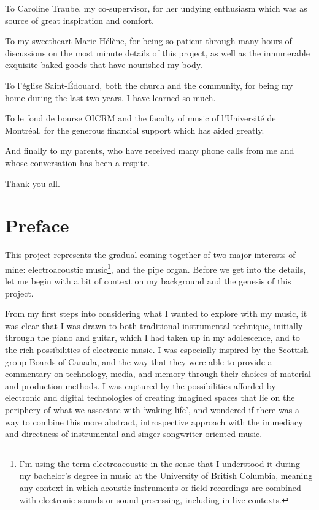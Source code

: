 \documentclass[12pt,twoside,maitrise]{dms_ks}
\theoremstyle{definition}
\begin{document}
{To Caroline Traube, my co-supervisor, for her undying enthusiasm which was as source of great inspiration and comfort.

To my sweetheart Marie-Hélène, for being so patient through many hours of discussions on the most minute details of this project, as well as the innumerable exquisite baked goods that have nourished my body.

To l'église Saint-Édouard, both the church and the community, for being my home during the last two years. I have learned so much.

To le fond de bourse OICRM and the faculty of music of l'Université de Montréal, for the generous financial support which has aided greatly.

And finally to my parents, who have received many phone calls from me and whose conversation has been a respite.

Thank you all.


\NoChapterPageNumber
\cleardoublepage
{}


\chapter*{Preface}


This project represents the gradual coming together of two major interests of mine: electroacoustic music\footnote{I'm using the term electroacoustic in the sense that I understood it during my bachelor's degree in music at the University of British Columbia, meaning any context in which acoustic instruments or field recordings are combined with electronic sounds or sound processing, including in live contexts.}, and the pipe organ. 
Before we get into the details, let me begin with a bit of context on my background and the genesis of this project.

From my first steps into considering what I wanted to explore with my music, it was clear that I was drawn to both traditional instrumental technique, initially through the piano and guitar, which I had taken up in my adolescence, and to the rich possibilities of electronic music. 
I was especially inspired by the Scottish group Boards of Canada, and the way that they were able to provide a commentary on technology, media, and memory through their choices of material and production methods. 
I was captured by the possibilities afforded by electronic and digital technologies of creating imagined spaces that lie on the periphery of what we associate with `waking life', and wondered if there was a way to combine this more abstract, introspective approach with the immediacy and directness of instrumental and singer songwriter oriented music.

}
\end{document}

